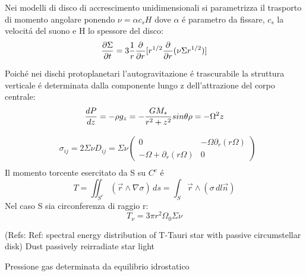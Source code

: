 Nei modelli di disco di accrescimento unidimensionali si parametrizza il trasporto di momento angolare ponendo $\nu=\alpha c_s H$ dove $\alpha$ \'e parametro da fissare, $c_s$ la velocit\'a del suono e H lo spessore del disco:
\begin{equation}
\PDy{t}{\Sigma}=3\frac{1}{r}\PDof{r}[r\expy{1/2}\PDof{r}(\nu\Sigma r\expy{1/2})]\label{eq:sigmaevol}
\end{equation}

Poich\'e nei dischi protoplanetari l'autogravitazione \'e trascurabile la struttura verticale \'e determinata dalla componente lungo z dell'attrazione del corpo centrale:
\begin{equation}
\TDy{z}{P}=-\rho g_z=-\frac{GM_*}{r^2+z^2}sin{\theta}\rho=-\Omega^2z
\end{equation}

\begin{workout}

\end{workout}

\begin{workout}
\begin{align}
&\sigma_{ij}=2\Sigma\nu D_{ij}=\Sigma\nu\begin{pmatrix}0&-\Omega\partial_r(r\Omega)\\-\Omega+\partial_r(r\Omega)&0
\end{pmatrix}\\
\end{align}
Il momento torcente esercitato da S su $C^c$ \'e
\begin{equation}
T=\iint_{S^c}(\vec{r}\wedge\nabla\sigma)\,ds=\int_S\vec{r}\wedge(\sigma\,dl\vec{n})
\end{equation}
Nel caso S sia circonferenza di raggio r:
\begin{equation}
T_{\nu}=3\pi r^2\Omega_0\Sigma\nu
\end{equation}
\end{workout}

\begin{workout}
(Refs: Ref: spectral energy distribution of T-Tauri star with passive circumstellar disk)
Dust passively reirradiate star light
\end{workout}

\begin{workout}
Pressione gas determinata da equilibrio idrostatico
\end{workout}

